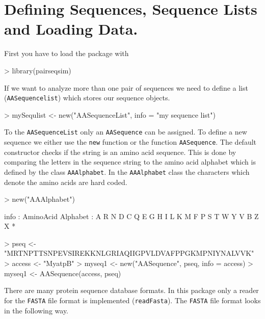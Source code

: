 \documentclass{article}
\begin{document}
\section{Defining Sequences, Sequence Lists and Loading Data.}
First you have to load the package with

\begin{Schunk}
\begin{Sinput}
> library(pairseqsim)
\end{Sinput}
\end{Schunk}

If we want to analyze more than one pair of sequences we need to define a list (\texttt{AASequencelist}) which stores our sequence objects. 
\begin{Schunk}
\begin{Sinput}
> mySequlist <- new("AASequenceList", info = "my sequence list")
\end{Sinput}
\end{Schunk}
 
To the \texttt{AASequenceList} only an \texttt{AASequence} can be assigned. To define a new sequence we either use the \texttt{new} function or the function \texttt{AASequence}. The default constructor checks if the string is an amino acid sequence. This is done by comparing the letters in the sequence string to the amino acid alphabet which is defined by the class \texttt{AAAlphabet}. In the \texttt{AAAlphabet} class the characters which denote the amino acids are hard coded.

\begin{Schunk}
\begin{Sinput}
> new("AAAlphabet")
\end{Sinput}
\begin{Soutput}
info :  AminoAcid 
Alphabet :
 A R N D C Q E G H I L K M F P S T W Y V B Z X * 
\end{Soutput}
\end{Schunk}

\begin{Schunk}
\begin{Sinput}
> pseq <- "MRTNPTTSNPEVSIREKKNLGRIAQIIGPVLDVAFPPGKMPNIYNALVVK"
> access <- "MyatpB"
> myseq1 <- new("AASequence", pseq, info = access)
> myseq1 <- AASequence(access, pseq)
\end{Sinput}
\end{Schunk}

There are many protein sequence database formats. In this package only a reader for the \texttt{FASTA} file format is implemented (\texttt{readFasta}). The \texttt{FASTA} file format looks in the following way.
\end{document}
